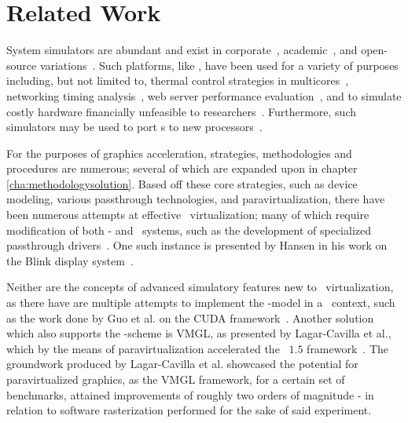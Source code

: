 
\chapter{Related Work}
\label{cha:relatedwork}
System simulators are abundant and exist in corporate~, academic~, and open-source variations~.
Such platforms, like \dvttermsimics , have been used for a variety of purposes including, but not limited to, thermal control strategies in multicores~, networking timing analysis~, web server performance evaluation~, and to simulate costly hardware financially unfeasible to researchers~.
Furthermore, such simulators may be used to port \dvttermos s to new processors~.

For the purposes of graphics acceleration, strategies, methodologies and procedures are numerous; several of which are expanded upon in chapter \ref{cha:methodologysolution}.
Based off these core strategies, such as device modeling, various passthrough technologies, and paravirtualization, there have been numerous attempts at effective \dvttermgpu\ virtualization; many of which require modification of both \dvttermtarget - and \dvttermhost\ systems, such as the development of specialized passthrough drivers~.
One such instance is presented by Hansen in his work on the Blink display system~.

Neither are the concepts of advanced simulatory features new to \dvttermgpu\ virtualization, as there have are multiple attempts to implement the \dvttermcheckpointrestart -model in a \dvttermgpu\ context, such as the work done by Guo et al. on the CUDA framework~.
Another solution which also supports the \dvttermcheckpointrestart -scheme is VMGL, as presented by Lagar-Cavilla et al., which by the means of paravirtualization accelerated the \dvttermopengl\ $1.5$ framework~.
The groundwork produced by Lagar-Cavilla et al. showcased the potential for paravirtualized graphics, as the VMGL framework, for a certain set of benchmarks, attained improvements of roughly two orders of magnitude - in relation to software rasterization performed for the sake of said experiment.

